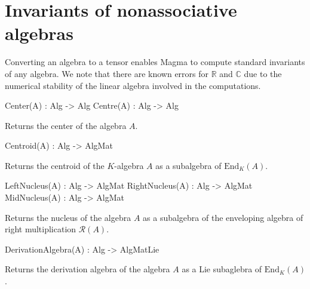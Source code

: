 
\section{Invariants of nonassociative algebras}

Converting an algebra to a tensor enables Magma to compute standard invariants of any algebra. 
We note that there are known errors for $\mathbb{R}$ and $\mathbb{C}$ due to the numerical stability of the linear algebra involved in the computations.

\begin{intrinsics}
Center(A) : Alg -> Alg
Centre(A) : Alg -> Alg
\end{intrinsics}

Returns the center of the algebra $A$.

\begin{intrinsics}
Centroid(A) : Alg -> AlgMat
\end{intrinsics}

Returns the centroid of the $K$-algebra $A$ as a subalgebra of $\text{End}_K(A)$.

\begin{intrinsics}
LeftNucleus(A) : Alg -> AlgMat
RightNucleus(A) : Alg -> AlgMat
MidNucleus(A) : Alg -> AlgMat
\end{intrinsics}

Returns the nucleus of the algebra $A$ as a subalgebra of the enveloping algebra of right multiplication $\mathcal{R}(A)$.

\begin{intrinsics}
DerivationAlgebra(A) : Alg -> AlgMatLie
\end{intrinsics}

Returns the derivation algebra of the algebra $A$ as a Lie subaglebra of $\text{End}_K(A)$.


